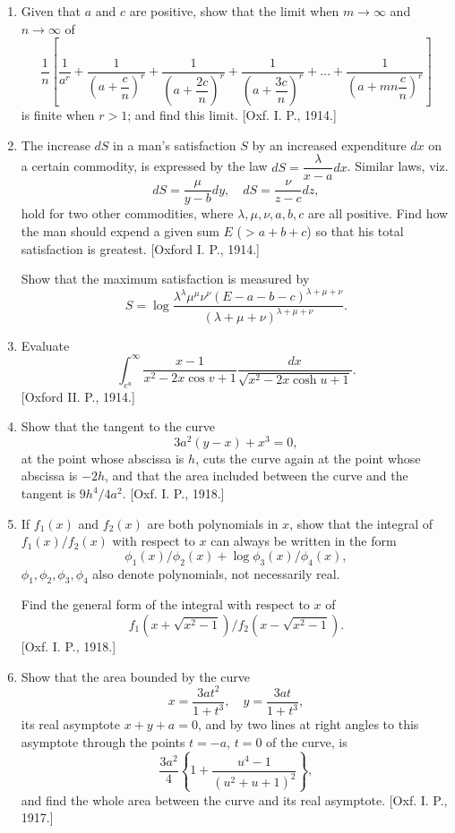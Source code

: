 \documentclass[11pt, a4paper]{article}
\newcommand{\source}[1]{\hfill\textnormal{[#1]}}
\begin{document}
\begin{enumerate}[leftmargin=2em]
\item Given that $a$ and $c$ are positive, show that the limit when $m\to\infty$ and $n\to\infty$ of
\[
\frac1n\left[\frac{1}{a^r}+\frac{1}{\left(a+\dfrac{c}{n}\right)^r}+\frac{1}{\left(a+\dfrac{2c}{n}\right)^r}+\frac{1}{\left(a+\dfrac{3c}{n}\right)^r}+\dots+\frac{1}{\left(a+mn\dfrac{c}{n}\right)^r}\right]
\]
is finite when $r>1$; and find this limit. \source{Oxf. I. P., 1914.}

\item The increase $dS$ in a man's satisfaction $S$ by an increased expenditure $dx$ on a certain commodity, is expressed by the law $dS=\dfrac{\lambda}{x-a}dx$. Similar laws, viz.
\[
dS=\frac{\mu}{y-b}dy,\quad dS=\frac{\nu}{z-c}dz,
\]
hold for two other commodities, where $\lambda,\mu,\nu,a,b,c$ are all positive. Find how the man should expend a given sum $E$ ($>a+b+c$) so that his total satisfaction is greatest. \source{Oxford I. P., 1914.}

Show that the maximum satisfaction is measured by
\[
S=\log\frac{\lambda^\lambda\mu^\mu\nu^\nu(E-a-b-c)^{\lambda+\mu+\nu}}{(\lambda+\mu+\nu)^{\lambda+\mu+\nu}}.
\]

\item Evaluate
\[
\int_{e^u}^\infty\frac{x-1}{x^2-2x\cos v+1}\frac{dx}{\sqrt{x^2-2x\cosh u+1}}.
\]
\source{Oxford II. P., 1914.}

\item Show that the tangent to the curve
\[
3a^2(y-x)+x^3=0,
\]
at the point whose abscissa is $h$, cuts the curve again at the point whose abscissa is $-2h$, and that the area included between the curve and the tangent is $9h^4/4a^2$. \source{Oxf. I. P., 1918.}

\item If $f_1(x)$ and $f_2(x)$ are both polynomials in $x$, show that the integral of $f_1(x)/f_2(x)$ with respect to $x$ can always be written in the form
\[
\phi_1(x)/\phi_2(x)+\log\phi_3(x)/\phi_4(x),
\]
$\phi_1,\phi_2,\phi_3,\phi_4$ also denote polynomials, not necessarily real.

Find the general form of the integral with respect to $x$ of
\[
f_1(x+\sqrt{x^2-1})/f_2(x-\sqrt{x^2-1}).
\]
\source{Oxf. I. P., 1918.}

\item Show that the area bounded by the curve
\[
x=\frac{3at^2}{1+t^3},\quad y=\frac{3at}{1+t^3},
\]
its real asymptote $x+y+a=0$, and by two lines at right angles to this asymptote through the points $t=-a$, $t=0$ of the curve, is
\[
\frac{3a^2}{4}\left\{1+\frac{u^4-1}{(u^2+u+1)^2}\right\},
\]
and find the whole area between the curve and its real asymptote. \source{Oxf. I. P., 1917.}


\end{enumerate}
\end{document}

